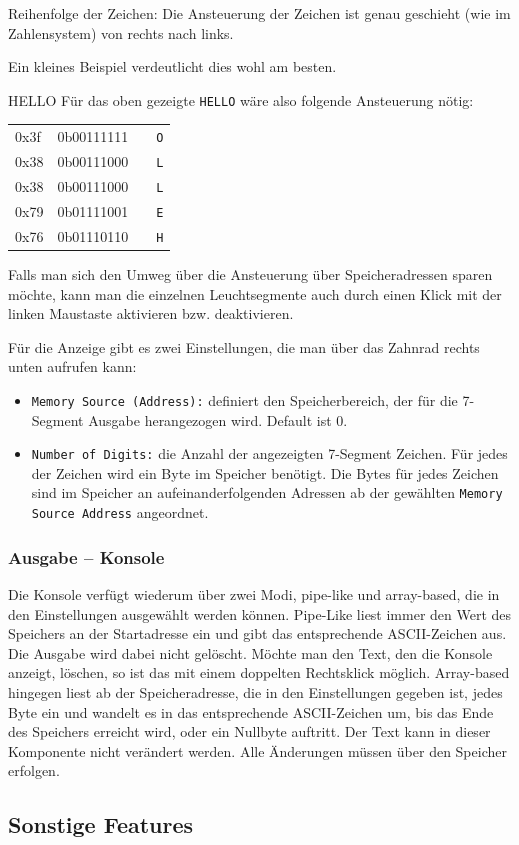 \begin{warningblock}
Reihenfolge der Zeichen: Die Ansteuerung der Zeichen ist genau geschieht (wie im Zahlensystem) von rechts nach links.
\end{warningblock}

Ein kleines Beispiel verdeutlicht dies wohl am besten.

\begin{exampleblock}{HELLO}
	Für das oben gezeigte \texttt{HELLO} wäre also folgende Ansteuerung nötig:\\
	\begin{tabular}{llll}
	0x3f & 0b00111111 & & \texttt{O}\\
	0x38 & 0b00111000 & & \texttt{L}\\
	0x38 & 0b00111000 & & \texttt{L}\\
	0x79 & 0b01111001 & & \texttt{E}\\
	0x76 & 0b01110110 & & \texttt{H}\\
	\end{tabular}
\end{exampleblock}

Falls man sich den Umweg über die Ansteuerung über Speicheradressen sparen möchte,
kann man die einzelnen Leuchtsegmente auch durch einen Klick mit der linken Maustaste aktivieren bzw. deaktivieren.

Für die Anzeige gibt es zwei Einstellungen, die man über das Zahnrad rechts unten aufrufen kann:\\
\begin{itemize}
\item \texttt{Memory Source (Address):} definiert den Speicherbereich, der für die 7-Segment Ausgabe herangezogen wird. Default ist 0.
\item \texttt{Number of Digits:} die Anzahl der angezeigten 7-Segment Zeichen. Für jedes der Zeichen wird ein Byte im Speicher benötigt.
					Die Bytes für jedes Zeichen sind im Speicher an aufeinanderfolgenden Adressen ab der gewählten  \texttt{Memory Source Address} angeordnet.
\end{itemize}



\subsubsection{Ausgabe -- Konsole}
Die Konsole verfügt wiederum über zwei Modi, pipe-like und array-based, die in den Einstellungen ausgewählt werden können. Pipe-Like liest immer den Wert des Speichers an der Startadresse ein und gibt das entsprechende ASCII-Zeichen aus. Die Ausgabe wird dabei nicht gelöscht. Möchte man den Text, den die Konsole anzeigt, löschen, so ist das mit einem doppelten Rechtsklick möglich.
Array-based hingegen liest ab der Speicheradresse, die in den Einstellungen gegeben ist, jedes Byte ein und wandelt es in das entsprechende ASCII-Zeichen um, bis das Ende des Speichers erreicht wird, oder ein Nullbyte auftritt. Der Text kann in dieser Komponente nicht verändert werden. Alle Änderungen müssen über den Speicher erfolgen.

\subsection{Sonstige Features}
